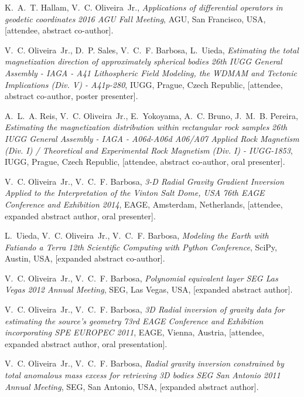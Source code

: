 \begin{thebibliography}{10}
K.~A.~T. Hallam, V.~C. Oliveira~Jr., \emph{Applications of differential
  operators in geodetic coordinates} \bblin{} \emph{2016 AGU Fall Meeting},
  AGU, San Francisco, USA, [attendee, abstract co-author].

V.~C. Oliveira~Jr., D.~P. Sales, V.~C.~F. Barbosa, L.~Uieda, \emph{Estimating
  the total magnetization direction of approximately spherical bodies} \bblin{}
  \emph{26th IUGG General Assembly - IAGA - A41 Lithospheric Field Modeling,
  the WDMAM and Tectonic Implications (Div. V) - A41p-280}, IUGG, Prague, Czech
  Republic, [attendee, abstract co-author, poster presenter].

A.~L.~A. Reis, V.~C. Oliveira~Jr., E.~Yokoyama, A.~C. Bruno, J.~M.~B. Pereira,
  \emph{Estimating the magnetization distribution within rectangular rock
  samples} \bblin{} \emph{26th IUGG General Assembly - IAGA - A06d-A06d A06/A07
  Applied Rock Magnetism (Div. I) / Theoretical and Experimental Rock Magnetism
  (Div. I) - IUGG-1853}, IUGG, Prague, Czech Republic, [attendee, abstract
  co-author, oral presenter].

V.~C. Oliveira~Jr., V.~C.~F. Barbosa, \emph{3-D Radial Gravity Gradient
  Inversion Applied to the Interpretation of the Vinton Salt Dome, USA}
  \bblin{} \emph{76th EAGE Conference and Exhibition 2014}, EAGE, Amsterdam,
  Netherlands, [attendee, expanded abstract author, oral presenter].

L.~Uieda, V.~C. Oliveira~Jr., V.~C.~F. Barbosa, \emph{Modeling the Earth with
  Fatiando a Terra} \bblin{} \emph{12th Scientific Computing with Python
  Conference}, SciPy, Austin, USA, [expanded abstract co-author].

V.~C. Oliveira~Jr., V.~C.~F. Barbosa, \emph{Polynomial equivalent layer}
  \bblin{} \emph{SEG Las Vegas 2012 Annual Meeting}, SEG, Las Vegas, USA,
  [expanded abstract author].

V.~C. Oliveira~Jr., V.~C.~F. Barbosa, \emph{3D Radial inversion of gravity data
  for estimating the source's geometry} \bblin{} \emph{73rd EAGE Conference and
  Exhibition incorporating SPE EUROPEC 2011}, EAGE, Vienna, Austria, [attendee,
  expanded abstract author, oral presentation].

V.~C. Oliveira~Jr., V.~C.~F. Barbosa, \emph{Radial gravity inversion
  constrained by total anomalous mass excess for retrieving 3D bodies} \bblin{}
  \emph{SEG San Antonio 2011 Annual Meeting}, SEG, San Antonio, USA, [expanded
  abstract author].

\end{thebibliography}
